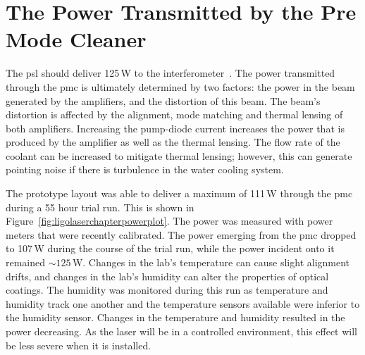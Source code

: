 \section{The Power Transmitted by the Pre Mode Cleaner}
The \gls{psl} should deliver 125\,\si{\watt} to the interferometer~\cite{PSL_requirements}. The power transmitted through the \gls{pmc} is ultimately determined by two factors: the power in the beam generated by the amplifiers, and the distortion of this beam. The beam's distortion is affected by the alignment, mode matching and thermal lensing of both amplifiers. Increasing the pump-diode current increases the power that is produced by the amplifier as well as the thermal lensing. The flow rate of the coolant can be increased to mitigate thermal lensing; however, this can generate pointing noise if there is turbulence in the water cooling system.
\par
The prototype layout was able to deliver a maximum of 111\,\si{\watt} through the \gls{pmc} during a 55 hour trial run. This is shown in Figure~\ref{fig:ligolaserchapterpowerplot}. The power was measured with power meters that were recently calibrated. The power emerging from the \gls{pmc} dropped to 107\,\si{\watt} during the course of the trial run, while the power incident onto it remained $\sim\!125\,\si{\watt}$. Changes in the lab's temperature can cause slight alignment drifts, and changes in the lab's humidity can alter the properties of optical coatings. The humidity was monitored during this run as temperature and humidity track one another and the temperature sensors available were inferior to the humidity sensor. Changes in the temperature and humidity resulted in the power decreasing. As the laser will be in a controlled environment, this effect will be less severe when it is installed. 
